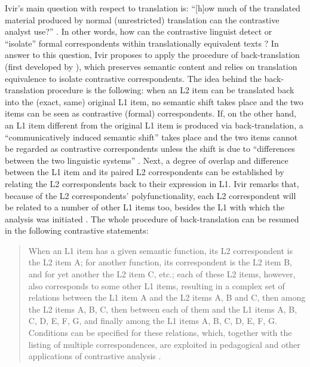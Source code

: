 Ivir’s main question with respect to translation is: “[h]ow much of the translated material produced by normal (unrestricted) translation can the contrastive analyst use?” \citep[16]{ivir_contrasting_1969}. In other words, how can the contrastive linguist detect or “isolate” formal correspondents within translationally equivalent texts \citep[175]{ivir_translation-based_1983}? In answer to this question, Ivir proposes to apply the procedure of back-translation (first developed by \citet{spalatin_contrastive_1967}), which preserves semantic content \citep[477]{dirven_functionalism_1987} and relies on translation equivalence to isolate contrastive correspondents. The idea behind the back-translation procedure is the following: when an L2 item can be translated back into the (exact, same) original L1 item, no semantic shift takes place and the two items can be seen as contrastive (formal) correspondents. If, on the other hand, an L1 item different from the original L1 item is produced via back-translation, a “communicatively induced semantic shift” takes place and the two items cannot be regarded as contrastive correspondents \citep[477]{dirven_functionalism_1987} unless the shift is due to “differences between the two linguistic systems” \citep[176]{ivir_translation-based_1983}. Next, a degree of overlap and difference between the L1 item and its paired L2 correspondents can be established by relating the L2 correspondents back to their expression in L1. Ivir remarks that, because of the L2 correspondents’ polyfunctionality, each L2 correspondent will be related to a number of other L1 items too, besides the L1 with which the analysis was initiated \citep[478]{dirven_functionalism_1987}. The whole procedure of back-translation can be resumed in the following contrastive statements:

\begin{quote}
When an L1 item has a given semantic function, its L2 correspondent is the L2 item A; for another function, its correspondent is the L2 item B, and for yet another the L2 item C, etc.; each of these L2 items, however, also corresponds to some other L1 items, resulting in a complex set of relations between the L1 item A and the L2 items A, B and C, then among the L2 items A, B, C, then between each of them and the L1 items A, B, C, D, E, F, G, and finally among the L1 items A, B, C, D, E, F, G. Conditions can be specified for these relations, which, together with the listing of multiple correspondences, are exploited in pedagogical and other applications of contrastive analysis \citep[478-479]{dirven_functionalism_1987}.
\end{quote}

